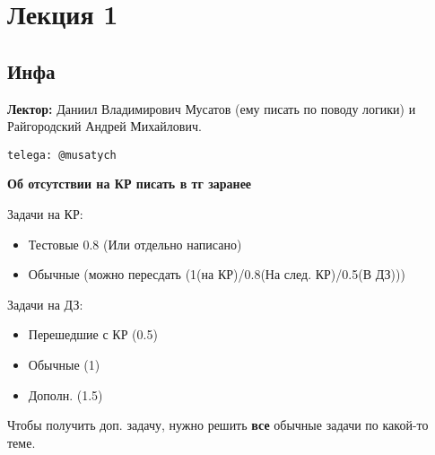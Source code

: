 \section{Лекция 1}

\subsection{Инфа}
\textbf{Лектор:} Даниил Владимирович Мусатов (ему писать по поводу логики) и Райгородский Андрей Михайлович.
\begin{verbatim}
telega: @musatych
\end{verbatim}
\textbf{Об отсутствии на КР писать в тг заранее}

Задачи на КР:
\begin{itemize}
    \item Тестовые 0.8 (Или отдельно написано)
    \item Обычные (можно пересдать (1(на КР)/0.8(На след. КР)/0.5(В ДЗ)))
\end{itemize}

Задачи на ДЗ:
\begin{itemize}
    \item Перешедшие с КР (0.5)
    \item Обычные (1)
    \item Дополн. (1.5)
\end{itemize}
\begin{note}
Чтобы получить доп. задачу, нужно решить \textbf{все} обычные задачи по какой-то теме.
\end{note}

